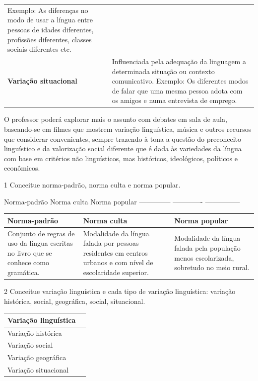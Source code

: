 \begin{longtable}[]{@{}ll@{}}
\begin{minipage}[t]{0.46\columnwidth}
Exemplo: As diferenças no modo de usar a língua entre pessoas de idades
diferentes, profissões diferentes, classes sociais diferentes etc.\strut
\end{minipage}\tabularnewline
\begin{minipage}[t]{0.46\columnwidth}\raggedright
\textbf{Variação situacional}\strut
\end{minipage} & \begin{minipage}[t]{0.46\columnwidth}\raggedright
Influenciada pela adequação da linguagem a determinada situação ou
contexto comunicativo. Exemplo: Os diferentes modos de falar que uma
mesma pessoa adota com os amigos e numa entrevista de emprego.\strut
\end{minipage}\tabularnewline
\bottomrule
\end{longtable}

O professor poderá explorar mais o assunto com debates em sala de aula,
baseando-se em filmes que mostrem variação linguística, música e outros
recursos que considerar convenientes, sempre trazendo à tona a questão
do preconceito linguístico e da valorização social diferente que é dada
às variedades da língua com base em critérios não linguísticos, mas
históricos, ideológicos, políticos e econômicos.


\num{1} Conceitue norma-padrão, norma culta e norma popular.

Norma-padrão Norma culta Norma popular -------------- -------------
---------------

\begin{longtable}[]{@{}lll@{}}
\toprule
Norma-padrão & Norma culta & Norma popular\tabularnewline
\midrule
\endhead
Conjunto de regras de uso da língua escritas no livro que se conhece
como gramática. & Modalidade da língua falada por pessoas residentes em
centros urbanos e com nível de escolaridade superior. & Modalidade da
língua falada pela população menos escolarizada, sobretudo no meio
rural.\tabularnewline
\bottomrule
\end{longtable}

\num{2} Conceitue variação linguística e cada tipo de variação
linguística: variação histórica, social, geográfica, social,
situacional.

\begin{longtable}[]{@{}ll@{}}
\toprule
Variação linguística &\tabularnewline
\midrule
\endhead
Variação histórica &\tabularnewline
Variação social &\tabularnewline
Variação geográfica &\tabularnewline
Variação situacional &\tabularnewline
\bottomrule
\end{longtable}

